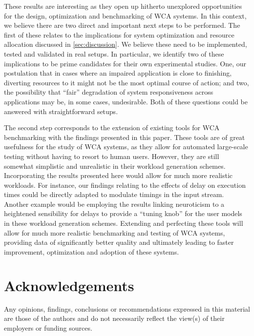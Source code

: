 \documentclass[10pt,letterpaper]{article}
\newenvironment{acks}{
  \section*{Acknowledgements}
}{}
\begin{document}
These results are interesting as they open up hitherto unexplored opportunities for the design, optimization and benchmarking of WCA systems.
In this context, we believe there are two direct and important next steps to be performed.
The first of these relates to the implications for system optimization and resource allocation discussed in \cref{sec:discussion}.
We believe these need to be implemented, tested and validated in real setups.
In particular, we identify two of these implications to be prime candidates for their own experimental studies.
One, our postulation that in cases where an impaired application is close to finishing, diverting resources to it might not be the most optimal course of action; and two, the possibility that ``fair'' degradation of system responsiveness across applications may be, in some cases, undesirable.
Both of these questions could be answered with straightforward setups.

The second step corresponds to the extension of existing tools for WCA benchmarking with the findings presented in this paper.
These tools are of great usefulness for the study of WCA systems, as they allow for automated large-scale testing without having to resort to human users.
However, they are still somewhat simplistic and unrealistic in their workload generation schemes.
Incorporating the results presented here would allow for much more realistic workloads.
For instance, our findings relating to the effects of delay on execution times could be directly adapted to modulate timings in the input stream.
Another example would be employing the results linking neuroticism to a heightened sensibility for delays to provide a ``tuning knob'' for the user models in these workload generation schemes.
Extending and perfecting these tools will allow for much more realistic benchmarking and testing of WCA systems, providing data of significantly better quality and ultimately leading to faster improvement, optimization and adoption of these systems.

\begin{acks}
  Any opinions, findings, conclusions or recommendations expressed in this material are those of the authors and do not necessarily reflect the view(s) of their employers or funding sources.
\end{acks}
\end{document}
